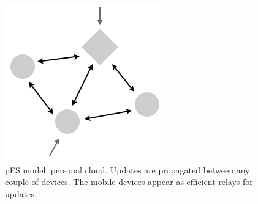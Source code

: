\begin{figure}[ht]
\begin{center}
  \includegraphics [scale=0.4] {img/pfs_model}
  \caption{\label{PfsModel} {\small pFS model: personal
      cloud. Updates are propagated between any couple of
      devices. The mobile devices appear as efficient relays 
      for updates.}}
\end{center}
\end{figure}






